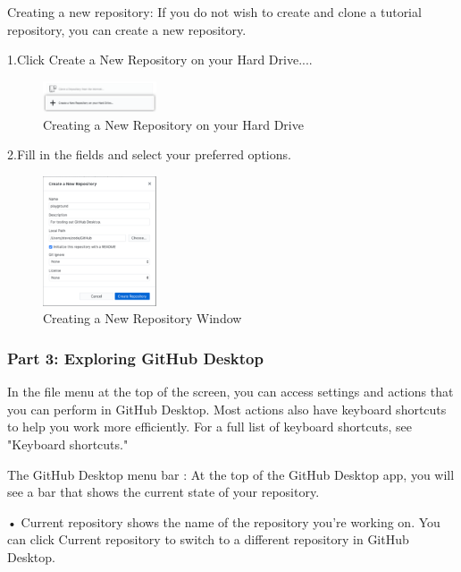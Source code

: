 Creating a new repository:
If you do not wish to create and clone a tutorial repository, you can create a new repository.

1.Click Create a New Repository on your Hard Drive....

\begin{figure}[ht]
    \centering
    \includegraphics[width=0.3\textwidth]{figures/Creating a New Repository on your Hard Drive.png}
    \caption{Creating a New Repository on your Hard Drive}
\end{figure}


2.Fill in the fields and select your preferred options.
\begin{figure}[ht]
    \centering
    \includegraphics[width=0.3\textwidth]{figures/Creating a New Repository Window.png}
    \caption{Creating a New Repository Window}
\end{figure}





\subsubsection{Part 3: Exploring GitHub Desktop}

In the file menu at the top of the screen, you can access settings and actions that you can perform in GitHub Desktop. Most actions also have keyboard shortcuts to help you work more efficiently. For a full list of keyboard shortcuts, see "Keyboard shortcuts."


The GitHub Desktop menu bar :
At the top of the GitHub Desktop app, you will see a bar that shows the current state of your repository.

•	Current repository shows the name of the repository you're working on. You can click Current repository to switch to a different repository in GitHub Desktop.

